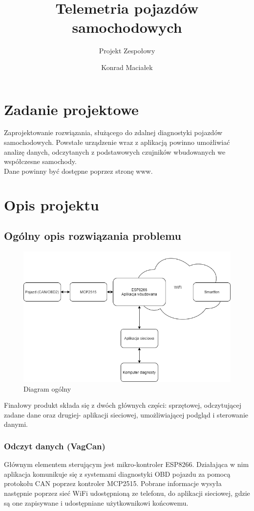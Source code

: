 \documentclass[10pt,a4paper]{scrartcl}
\author{Konrad Maciałek}
\title{Telemetria pojazdów samochodowych}
\subtitle{Projekt Zespołowy}
\begin{document}
	\maketitle
	\newpage
	\section{Zadanie projektowe}
	Zaprojektowanie rozwiązania, służącego do zdalnej diagnostyki pojazdów samochodowych. Powstałe urządzenie wraz z aplikacją powinno umożliwiać analizę danych, odczytanych z podstawowych czujników wbudowanych we współczesne samochody.
	\\
	Dane powinny być dostępne poprzez stronę www.
	\section{Opis projektu}
		\subsection{Ogólny opis rozwiązania problemu}
		\begin{figure}[H]
			\centering
			\includegraphics[width=0.7\linewidth]{./remoteCarDiagz.drawio}
			\caption[Diagram ogólny]{Diagram ogólny}
			\label{fig:remotecardiagz}
		\end{figure}
		Finałowy produkt składa się z dwóch głównych części: sprzętowej, odczytującej zadane dane oraz drugiej- aplikacji sieciowej, umożliwiającej podgląd i sterowanie danymi. 
		\subsubsection{Odczyt danych (VagCan)}
		Głównym elementem sterującym jest mikro-kontroler ESP8266. Działająca w nim aplikacja komunikuje się z systemami diagnostyki OBD pojazdu za pomocą protokołu CAN poprzez kontroler MCP2515. Pobrane informacje wysyła następnie poprzez sieć WiFi udostępnioną ze telefonu, do aplikacji sieciowej, gdzie są one zapisywane i udostępniane użytkownikowi końcowemu. 
\end{document}
